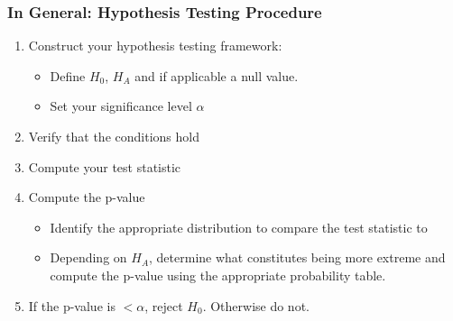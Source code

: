 \documentclass[handout]{beamer}
\newcommand{\blue}[1]{\textcolor{blue2}{#1}}
\begin{document}
\begin{frame}
\frametitle{In General:  Hypothesis Testing Procedure}\label{ht}
\begin{enumerate}
\pause\item Construct your hypothesis testing framework:
\begin{itemize}
\item Define $H_0$, $H_A$ and if applicable a null value.
\item Set your significance level $\alpha$
\end{itemize}
\pause\item Verify that the conditions hold
\pause\item Compute your \blue{test statistic}
\pause\item Compute the p-value
\begin{itemize}
\item Identify the appropriate distribution to compare the test statistic to
\item Depending on $H_A$, determine what constitutes being \blue{more extreme} and compute the p-value using the appropriate probability table.
\end{itemize}
\pause\item If the p-value is $< \alpha$, reject $H_0$.  Otherwise do not.
\end{enumerate}

\end{frame}
\end{document}
